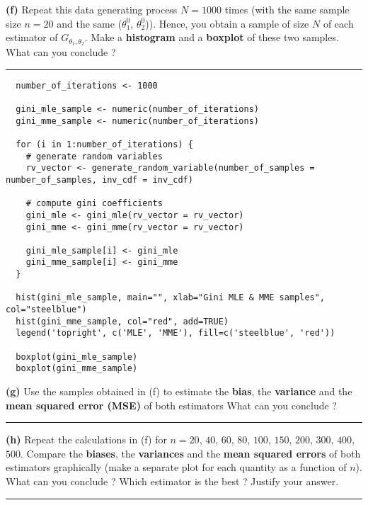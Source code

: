 \documentclass[10pt, a4paper, nofootinbib]{scrartcl}
\begin{document}
\textbf{(f)} Repeat this data generating process $N = 1000$ times (with the same sample size $n = 20$ and the same ($\theta_1^0$, $\theta_2^0$)). Hence, you obtain a sample of size $N$ of each estimator of $G_{\theta_1, \theta_2}$. Make a \textbf{histogram} and a \textbf{boxplot} of these two samples. What can you conclude ?

\begin{center}\rule{6cm}{0.4pt}\end{center}

\begin{verbatim}
  number_of_iterations <- 1000

  gini_mle_sample <- numeric(number_of_iterations)
  gini_mme_sample <- numeric(number_of_iterations)
  
  for (i in 1:number_of_iterations) {
    # generate random variables
    rv_vector <- generate_random_variable(number_of_samples = number_of_samples, inv_cdf = inv_cdf)
  
    # compute gini coefficients
    gini_mle <- gini_mle(rv_vector = rv_vector)
    gini_mme <- gini_mme(rv_vector = rv_vector)
  
    gini_mle_sample[i] <- gini_mle
    gini_mme_sample[i] <- gini_mme
  }
  
  hist(gini_mle_sample, main="", xlab="Gini MLE & MME samples", col="steelblue")
  hist(gini_mme_sample, col="red", add=TRUE)
  legend('topright', c('MLE', 'MME'), fill=c('steelblue', 'red'))
  
  boxplot(gini_mle_sample)
  boxplot(gini_mme_sample)
\end{verbatim}


\textbf{(g)} Use the samples obtained in (f) to estimate the \textbf{bias}, the \textbf{variance} and the \textbf{mean squared error (MSE)} of both estimators What can you conclude ?

\begin{center}\rule{6cm}{0.4pt}\end{center}

\textbf{(h)} Repeat the calculations in (f) for $n = 20$, $40$, $60$, $80$, $100$, $150$, $200$, $300$, $400$, $500$. Compare the \textbf{biases}, the \textbf{variances} and the \textbf{mean squared errors} of both estimators graphically (make a separate plot for each quantity as a function of $n$). What can you conclude ? Which estimator is the best ? Justify your answer.

\begin{center}\rule{6cm}{0.4pt}\end{center}
\end{document}
